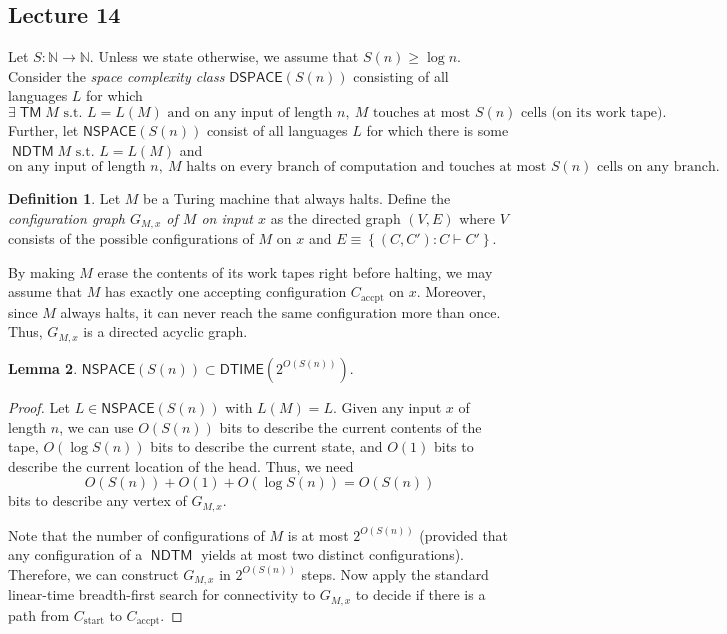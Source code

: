 \documentclass[10pt,letterpaper,cm]{nupset}
\theoremstyle{definition}
\newtheorem{definition}{Definition}[subsection]
\theoremstyle{theorem}
\newtheorem{lemma}[definition]{Lemma}
\theoremstyle{remark}
\newcommand{\N}{\mathbb N}
\newcommand{\1}{\mathbf{1}}
\newcommand{\accpt}{\mathrm{accpt}}
\newcommand{\0}{\vec 0}
\DeclareMathOperator{\TM}{\mathsf{TM}}
\DeclareMathOperator{\NDTM}{\mathsf{NDTM}}
\begin{document}
\subsection{Lecture 14}

Let $S: \N \to \N$. Unless we state otherwise, we assume that $S(n) \geq \log{n}$.
Consider the \textit{space complexity class} 
$\mathsf{DSPACE}(S(n))$ consisting of all languages $L$ for which $$\exists \TM M\text{ s.t. }L = L(M) \text{ and on any input of length }n,\ M \text{ touches at most }S(n)\text{ cells (on its work tape)}.$$
Further, let $\mathsf{NSPACE}(S(n))$ consist of all languages $L$ for which  there is some $\NDTM M\text{ s.t. } L = L(M)$ and
\[
\text{on any input of length }n,\ M\text{ halts on every branch of computation and touches at most }S(n)\text{ cells on any branch}.
\]


\begin{definition}
Let $M$ be a Turing machine that always halts. Define the \textit{configuration graph $G_{M,x}$ of $M$ on input $x$} as the directed graph $\left(V, E\right)$ where $V$ consists of the possible configurations of $M$ on $x$ and $E \equiv \left\{(C,C') : C \vdash C'\right\}$.
\end{definition}

 By making $M$ erase the contents of its work tapes right before halting, we may assume that $M$ has exactly one accepting configuration $C_{\accpt}$ on $x$.
Moreover,
since $M$ always halts, it can never reach the same configuration more than once. Thus, $G_{M,x}$ is a directed acyclic graph.  


\begin{lemma}
$\mathsf{NSPACE}(S(n)) \subset \mathsf{DTIME}(2^{O(S(n))})$.
\end{lemma}
\begin{proof}
Let $L \in \mathsf{NSPACE}(S(n)) $ with $L(M) = L$.  Given any input $x$ of length $n$, we can use $O(S(n))$ bits to describe the current contents of the tape, $O(\log{S(n)})$ bits to describe the current state, and $O(1)$ bits to describe the current location of the head. Thus, we need $$O(S(n)) + O(1) + O(\log{S(n)})= O(S(n))$$ bits to describe any vertex of $G_{M,x}$. 

\medskip


Note that the number of configurations of $M$ is at most $2^{O(S(n))}$ (provided that any configuration of a $\NDTM$ yields at most two distinct configurations).  Therefore, we can construct $G_{M,x}$ in $2^{O(S(n))}$ steps. Now apply the standard linear-time breadth-first search for connectivity to $G_{M,x}$ to decide if there is a path from $C_{\mathrm{start}}$ to $C_{\accpt}$. 
\end{proof}
\end{document}
